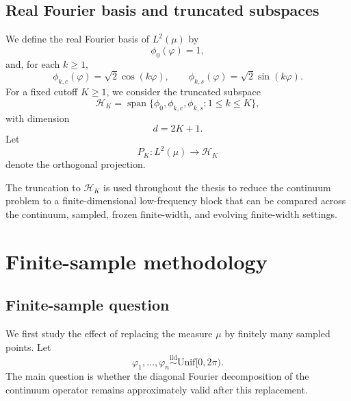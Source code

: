 \subsection{Real Fourier basis and truncated subspaces}

We define the real Fourier basis of \(L^2(\mu)\) by
\begin{equation}
	\phi_0(\varphi)=1,
	\label{eq:method-fourier-basis-phi0}
\end{equation}
and, for each \(k\geq 1\),
\begin{equation}
	\phi_{k,c}(\varphi)=\sqrt{2}\cos(k\varphi),
	\qquad
	\phi_{k,s}(\varphi)=\sqrt{2}\sin(k\varphi).
	\label{eq:method-fourier-basis-modes}
\end{equation}
For a fixed cutoff \(K\geq 1\), we consider the truncated subspace
\begin{equation}
	\mathcal{H}_K=\operatorname{span}\{\phi_0,\phi_{k,c},\phi_{k,s}:1\leq k\leq K\},
	\label{eq:method-low-frequency-subspace}
\end{equation}
with dimension
\begin{equation}
	d=2K+1.
	\label{eq:method-block-dimension}
\end{equation}
Let
\begin{equation}
	P_K:L^2(\mu)\to \mathcal{H}_K
	\label{eq:method-projection-PK}
\end{equation}
denote the orthogonal projection.

The truncation to \(\mathcal{H}_K\) is used throughout the thesis to reduce the continuum problem to a
finite-dimensional low-frequency block that can be compared across the continuum, sampled,
frozen finite-width, and evolving finite-width settings.

\section{Finite-sample methodology}

\subsection{Finite-sample question}

We first study the effect of replacing the measure \(\mu\) by finitely many sampled points. Let
\begin{equation}
	\varphi_1,\dots,\varphi_n \overset{\mathrm{iid}}{\sim} \mathrm{Unif}[0,2\pi).
	\label{eq:method-sampled-angles}
\end{equation}
The main question is whether the diagonal Fourier decomposition of the continuum operator
remains approximately valid after this replacement.

